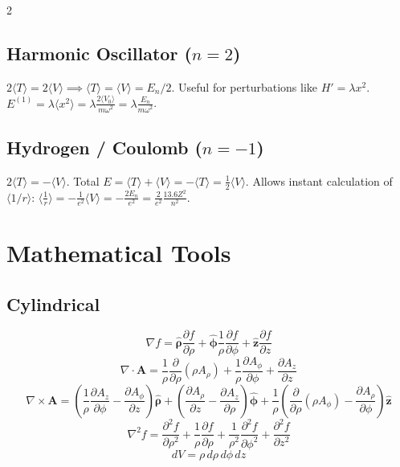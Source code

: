 \documentclass[9pt,a4paper]{article} %
\newcommand{\bs}[1]{\symbf{#1}}\usepackage{empheq}   %
\begin{document}
\begin{multicols}{2}
\subsection{ Harmonic Oscillator ($n=2$)}
$2\langle T \rangle = 2\langle V \rangle \implies \langle T \rangle = \langle V \rangle = E_n/2$.
Useful for perturbations like $H' = \lambda x^2$.
$E^{(1)} = \lambda \langle x^2 \rangle = \lambda \frac{2\langle V_0 \rangle}{m\omega^2} = \lambda \frac{E_n}{m\omega^2}$.

\subsection{ Hydrogen / Coulomb ($n=-1$)}
$2\langle T \rangle = -\langle V \rangle$.
Total $E = \langle T \rangle + \langle V \rangle = -\langle T \rangle = \frac{1}{2}\langle V \rangle$.
Allows instant calculation of $\langle 1/r \rangle$:
$\langle \frac{1}{r} \rangle = -\frac{1}{e^2}\langle V \rangle = -\frac{2E_n}{e^2} = \frac{2}{e^2}\frac{13.6 Z^2}{n^2}$.



\newpage
\section{Mathematical Tools}
\subsection{Cylindrical}
\[\nabla f =
\hat{\bs{\rho}} \frac{\partial f}{\partial \rho}
+
\hat{\bs{\phi}} \frac{1}{\rho} \frac{\partial f}{\partial \phi}
+
\hat{\mathbf{z}} \frac{\partial f}{\partial z}
\]
\[
\nabla \cdot \mathbf{A}
=
\frac{1}{\rho}\frac{\partial}{\partial \rho}\!\left(\rho A_\rho\right)
+
\frac{1}{\rho}\frac{\partial A_\phi}{\partial \phi}
+
\frac{\partial A_z}{\partial z}
\]
\[
\nabla \times \mathbf{A}
=
\left(
\frac{1}{\rho}\frac{\partial A_z}{\partial \phi}
-
\frac{\partial A_\phi}{\partial z}
\right)\hat{\bs{\rho}}
+
\left(
\frac{\partial A_\rho}{\partial z}
-
\frac{\partial A_z}{\partial \rho}
\right)\hat{\bs{\phi}}
+
\frac{1}{\rho}
\left(
\frac{\partial}{\partial \rho}(\rho A_\phi)
-
\frac{\partial A_\rho}{\partial \phi}
\right)\hat{\mathbf{z}}
\]
\[\nabla^2 f = \frac{\partial^2 f}{\partial \rho^2} + \frac{1}{\rho} \frac{\partial f}{\partial \rho} + \frac{1}{\rho^2} \frac{\partial^2 f}{\partial \phi^2} + \frac{\partial^2 f}{\partial z^2}\]
    \[
        dV = \rho \, d\rho \, d\phi \, dz
    \]


\end{multicols}
\end{document}
